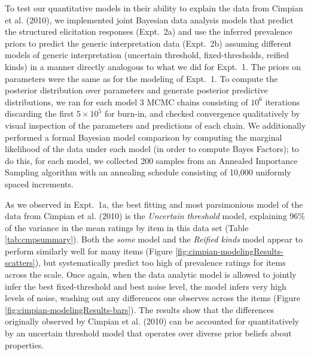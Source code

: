 \documentclass[floatsintext,doc]{apa6}
\begin{document}
To test our quantitative models in their ability to explain the data from Cimpian et al. (2010), we implemented joint Bayesian data analysis models that predict the structured elicitation responses (Expt.~2a) and use the inferred prevalence priors to predict the generic interpretation data (Expt.~2b) assuming different models of generic interpretation (uncertain threshold, fixed-thresholds, reified kinds) in a manner directly analogous to what we did for Expt.~1. 
The priors on parameters were the same as for the modeling of Expt.~1. 
To compute the posterior distribution over parameters and generate posterior predictive distributions, we ran for each model 3 MCMC chains consisting of $10^6$ iterations discarding the first $5 \times 10^5$ for burn-in, and checked convergence qualitatively by visual inspection of the parameters and predictions of each chain. 
We additionally performed a formal Bayesian model comparison by computing the marginal likelihood of the data under each model (in order to compute Bayes Factors); to do this, for each model, we collected 200 samples from an Annealed Importance Sampling algorithm with an annealing schedule consisting of 10,000 uniformly spaced increments. 

As we observed in Expt.~1a, the best fitting and most parsimonious model of the data from Cimpian et al. (2010) is the \emph{Uncertain threshold} model, explaining 96\% of the variance in the mean ratings by item in this data set (Table \ref{tab:cmpsummary}).
Both the \emph{some} model and the \emph{Reified kinds} model appear to perform similarly well for many items (Figure \ref{fig:cimpian-modelingResults-scatters}), but systematically predict too high of prevalence ratings for items across the scale. 
Once again, when the data analytic model is allowed to jointly infer the best fixed-threshold and best noise level, the model infers very high levels of noise, washing out any differences one observes across the items (Figure \ref{fig:cimpian-modelingResults-bars}).
The results show that the differences originally observed by Cimpian et al. (2010) can be accounted for quantitatively by an uncertain threshold model that operates over diverse prior beliefs about properties.

\end{document}
